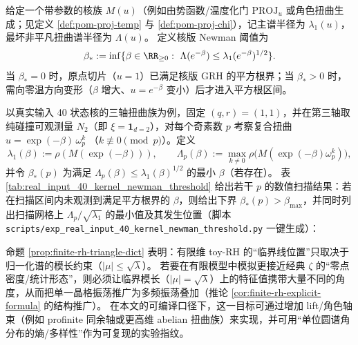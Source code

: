 \begin{definition}\label{def:kernel-newman-threshold}
给定一个带参数的核族 \(M(u)\)（例如由势函数/温度化门 \(\mathrm{PROJ}_u\) 或角色扭曲生成；见定义 \ref{def:pom-proj-temp} 与 \ref{def:pom-proj-chi}），记主谱半径为 \(\lambda_1(u)\)，最坏非平凡扭曲谱半径为 \(\Lambda(u)\)。
定义核版 Newman 阈值为
\[
\beta_\ast:=\inf\{\beta\in\RR_{\ge 0}:\ \Lambda(e^{-\beta})\le \lambda_1(e^{-\beta})^{1/2}\}.
\]
当 \(\beta_\ast=0\) 时，原点切片（\(u=1\)）已满足核版 GRH 的平方根界；当 \(\beta_\ast>0\) 时，需向零温方向变形（\(\beta\) 增大、\(u=e^{-\beta}\) 变小）后才进入平方根区间。
\end{definition}

\begin{remark}\label{rem:kernel-newman-threshold-repro}
以真实输入 40 状态核的三轴扭曲族为例，固定 \((q,r)=(1,1)\)，并在第三轴取纯碰撞可观测量 \(N_2\)（即 \(\xi=\mathbf{1}_{d=2}\)），对每个奇素数 \(p\) 考察复合扭曲
\(
u=\exp(-\beta)\,\omega_p^k
\)
（\(k\not\equiv 0\!\!\pmod p\)）。定义
\[
\lambda_1(\beta):=\rho(M(\exp(-\beta))),\qquad
\Lambda_p(\beta):=\max_{k\neq 0}\rho\bigl(M(\exp(-\beta)\omega_p^k)\bigr),
\]
并令 \(\beta_\ast(p)\) 为满足 \(\Lambda_p(\beta)\le \lambda_1(\beta)^{1/2}\) 的最小 \(\beta\)（若存在）。
表 \ref{tab:real_input_40_kernel_newman_threshold} 给出若干 \(p\) 的数值扫描结果：若在扫描区间内未观测到满足平方根界的 \(\beta\)，则给出下界 \(\beta_\ast(p)>\beta_{\max}\)，并同时列出扫描网格上 \(\Lambda_p/\sqrt{\lambda_1}\) 的最小值及其发生位置（脚本 \texttt{scripts/exp\_real\_input\_40\_kernel\_newman\_threshold.py} 一键生成）：

\end{remark}

\begin{remark}\label{rem:finite-rh-angle-entropy}
命题 \ref{prop:finite-rh-triangle-dict} 表明：有限维 toy-RH 的“临界线位置”只取决于归一化谱的模长约束（\( |\mu|\le \sqrt\lambda \)）。
若要在有限模型中模拟更接近经典 \(\zeta\) 的“零点密度/统计形态”，则必须让临界模长（\(|\mu|=\sqrt\lambda\)）上的特征值携带大量不同的角度，从而把单一晶格振荡推广为多频振荡叠加（推论 \ref{cor:finite-rh-explicit-formula} 的结构推广）。
在本文的可编译口径下，这一目标可通过增加 lift/角色轴束（例如 profinite 同余轴或更高维 abelian 扭曲族）来实现，并可用“单位圆谱角分布的熵/多样性”作为可复现的实验指纹。
\end{remark}


